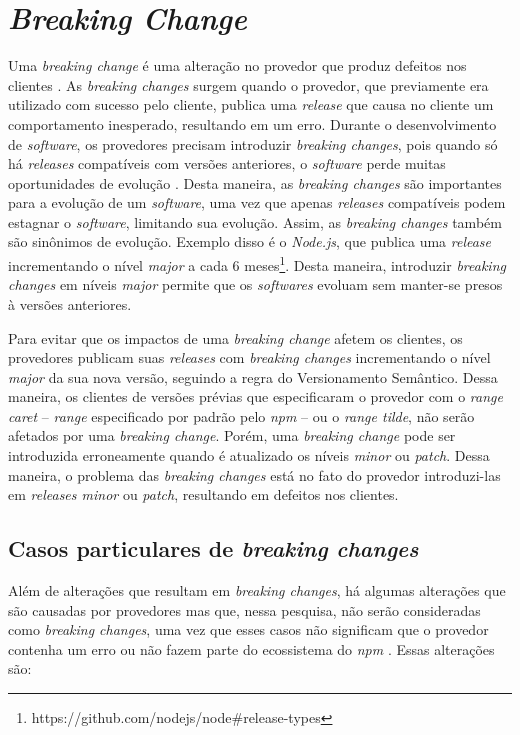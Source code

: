 \section{\textit{Breaking Change}}
\label{ref-teo:breaking_change}
Uma \textit{breaking change} é uma alteração no provedor que produz defeitos nos clientes \cite{teorical_reference:semver}. As \textit{breaking changes} surgem quando o provedor, que previamente era utilizado com sucesso pelo cliente, publica uma \textit{release} que causa no cliente um comportamento inesperado, resultando em um erro. Durante o desenvolvimento de \textit{software}, os provedores precisam introduzir \textit{breaking changes}, pois quando só há \textit{releases} compatíveis com versões anteriores, o \textit{software} perde muitas oportunidades de evolução \cite{teorical_reference:bc_2}. Desta maneira, as \textit{breaking changes} são importantes para a evolução de um \textit{software}, uma vez que apenas \textit{releases} compatíveis podem estagnar o \textit{software}, limitando sua evolução. Assim, as \textit{breaking changes} também são sinônimos de evolução. Exemplo disso é o \textit{Node.js}, que publica uma \textit{release} incrementando o nível \textit{major} a cada 6 meses\footnote{https://github.com/nodejs/node\#release-types}. Desta maneira, introduzir \textit{breaking changes} em níveis \textit{major} permite que os \textit{softwares} evoluam sem manter-se presos à versões anteriores.

Para evitar que os impactos de uma \textit{breaking change} afetem os clientes, os provedores publicam suas \textit{releases} com \textit{breaking changes} incrementando o nível \textit{major} da sua nova versão, seguindo a regra do Versionamento Semântico. Dessa maneira, os clientes de versões prévias que especificaram o provedor com o \textit{range caret} -- \textit{range} especificado por padrão pelo \textit{npm} -- ou o \textit{range tilde}, não serão afetados por uma \textit{breaking change}. Porém, uma \textit{breaking change} pode ser introduzida erroneamente quando é atualizado os níveis \textit{minor} ou \textit{patch}. Dessa maneira, o problema das \textit{breaking changes} está no fato do provedor introduzi-las em \textit{releases minor} ou \textit{patch}, resultando em defeitos nos clientes.

\subsection{Casos particulares de \textit{breaking changes}}
Além de alterações que resultam em \textit{breaking changes}, há algumas alterações que são causadas por provedores mas que, nessa pesquisa, não serão consideradas como \textit{breaking changes}, uma vez que esses casos não significam que o provedor contenha um erro ou não fazem parte do ecossistema do \textit{npm} . Essas alterações são:

